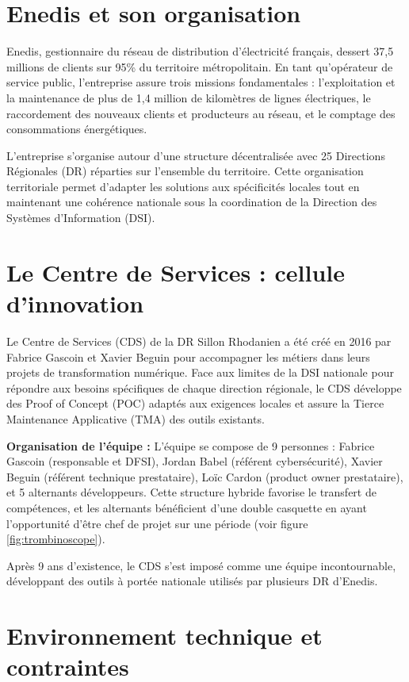 \section{Enedis et son organisation}

Enedis, gestionnaire du réseau de distribution d'électricité français, dessert 37,5 millions de clients sur 95\% du territoire métropolitain.
En tant qu'opérateur de service public, l'entreprise assure trois missions fondamentales : l'exploitation et la maintenance de plus de 1,4 million de kilomètres de lignes électriques, le raccordement des nouveaux clients et producteurs au réseau, et le comptage des consommations énergétiques.

L'entreprise s'organise autour d'une structure décentralisée avec 25 Directions Régionales (DR) réparties sur l'ensemble du territoire.
Cette organisation territoriale permet d'adapter les solutions aux spécificités locales tout en maintenant une cohérence nationale sous la coordination de la Direction des Systèmes d'Information (DSI).


\section{Le Centre de Services : cellule d'innovation}

Le Centre de Services (CDS) de la DR Sillon Rhodanien a été créé en 2016 par Fabrice Gascoin et Xavier Beguin pour accompagner les métiers dans leurs projets de transformation numérique.
Face aux limites de la DSI nationale pour répondre aux besoins spécifiques de chaque direction régionale, le CDS développe des Proof of Concept (POC) adaptés aux exigences locales et assure la Tierce Maintenance Applicative (TMA) des outils existants.

\textbf{Organisation de l'équipe :} L'équipe se compose de 9 personnes : Fabrice Gascoin (responsable et DFSI), Jordan Babel (référent cybersécurité), Xavier Beguin (référent technique prestataire), Loïc Cardon (product owner prestataire), et 5 alternants développeurs.
Cette structure hybride favorise le transfert de compétences, et les alternants bénéficient d'une double casquette en ayant l'opportunité d'être chef de projet sur une période (voir figure \ref{fig:trombinoscope}).

Après 9 ans d'existence, le CDS s'est imposé comme une équipe incontournable, développant des outils à portée nationale utilisés par plusieurs DR d'Enedis.


\section{Environnement technique et contraintes}

